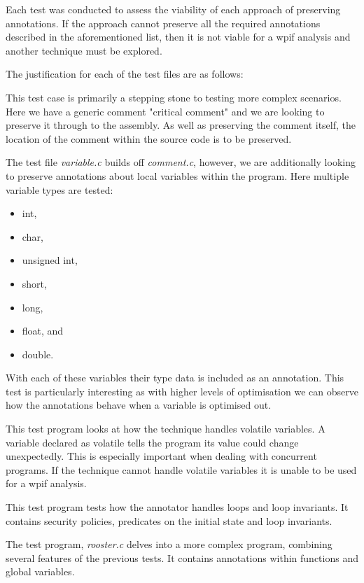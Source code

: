 Each test was conducted to assess the viability of each approach of preserving annotations. If the approach cannot preserve all the required annotations described in the aforementioned list, then it is not viable for a wpif analysis and another technique must be explored.

The justification for each of the test files are as follows:

This test case is primarily a stepping stone to testing more complex scenarios. Here we have a generic comment "critical comment" and we are looking to preserve it through to the assembly. As well as preserving the comment itself, the location of the comment within the source code is to be preserved.

The test file \textit{variable.c} builds off \textit{comment.c}, however, we are additionally looking to preserve annotations about local variables within the program. Here multiple variable types are tested:

\begin{itemize}
    \item int,
    \item char,
    \item unsigned int,
    \item short,
    \item long,
    \item float, and
    \item double.
\end{itemize}

With each of these variables their type data is included as an annotation. This test is particularly interesting as with higher levels of optimisation we can observe how the annotations behave when a variable is optimised out.

This test program looks at how the technique handles volatile variables. A variable declared as volatile tells the program its value could change unexpectedly. This is especially important when dealing with concurrent programs. If the technique cannot handle volatile variables it is unable to be used for a wpif analysis.

This test program tests how the annotator handles loops and loop invariants. It contains security policies, predicates on the initial state and loop invariants.

The test program, \textit{rooster.c} delves into a more complex program, combining several features of the previous tests. It contains annotations within functions and global variables.

